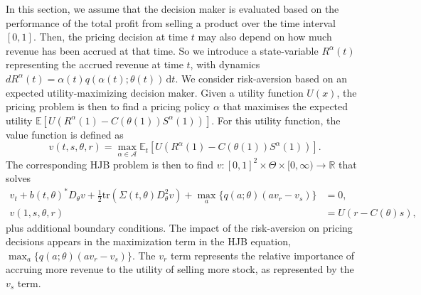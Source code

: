 \documentclass[main.tex]{subfiles}
\begin{document}
In this section, we assume that the decision maker is evaluated based on
the performance of the total profit from selling a product over the
time interval $[0,1]$. Then, the pricing decision at time $t$ may also depend
on how much revenue has been accrued at that time. So we
introduce a state-variable $R^\alpha(t)$ representing the accrued
revenue at time $t$, with dynamics
$dR^\alpha(t)=\alpha(t)q(\alpha(t);\theta(t))\,\mathrm{d}t$.
We consider risk-aversion based on
an expected utility-maximizing decision maker.
Given a utility function $U(x)$, the pricing problem is then to
find a pricing policy $\alpha$ that maximises the expected utility
$\mathbb E[U(R^\alpha(1)-C(\theta(1))S^\alpha(1))]$.
For this utility function, the value function is defined as
\begin{equation}
  v(t,s,\theta,r)=
  \max_{\alpha\in\mathcal A}
  \mathbb E_t\left[
    U\left(R^\alpha(1)-C(\theta(1))S^\alpha(1)\right)
  \right].
\end{equation}
The corresponding HJB problem is then to find
$v:{[0,1]}^2\times \Theta\times{[0,\infty)}\to\mathbb R$ that solves
\begin{align}\label{eq:hjb_utility}
  v_t+{b(t,\theta)}^* D_\theta v
  + {\textstyle\frac{1}{2}}\mbox{tr}\left( \Sigma(t,\theta)
  D_\theta^2v \right)
  +\max_{a}\{q(a;\theta)(av_r-v_s)\}&=0,\\
  v(1,s,\theta,r) &= U(r-C(\theta)s),
\end{align}
plus additional boundary conditions. The impact of the risk-aversion
on pricing decisions appears in the maximization term in the HJB
equation, $\max_a\{q(a;\theta)(av_r-v_s)\}$. The $v_r$ term represents
the relative importance of accruing more revenue to the utility of
selling more stock, as represented by the $v_s$ term.
\end{document}
